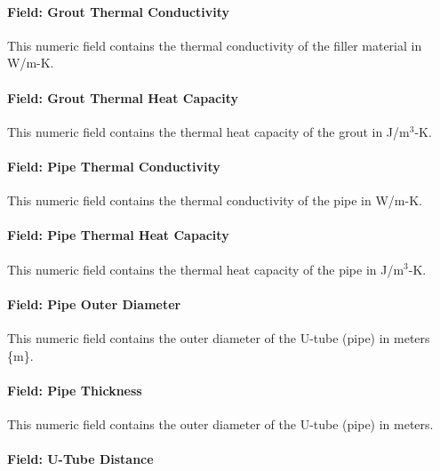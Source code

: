 \paragraph{Field: Grout Thermal Conductivity}\label{field-grout-thermal-conductivity}

This numeric field contains the thermal conductivity of the filler material in W/m-K.

\paragraph{Field: Grout Thermal Heat Capacity}

This numeric field contains the thermal heat capacity of the grout in J/m\(^{3}\)-K.

\paragraph{Field: Pipe Thermal Conductivity}\label{field-pipe-thermal-conductivity-000}

This numeric field contains the thermal conductivity of the pipe in W/m-K.

\paragraph{Field: Pipe Thermal Heat Capacity}

This numeric field contains the thermal heat capacity of the pipe in J/m\(^{3}\)-K.

\paragraph{Field: Pipe Outer Diameter}\label{field-pipe-out-diameter}

This numeric field contains the outer diameter of the U-tube (pipe) in meters \{m\}.

\paragraph{Field: Pipe Thickness}\label{field-pipe-thickness-000}

This numeric field contains the outer diameter of the U-tube (pipe) in meters.

\paragraph{Field: U-Tube Distance}\label{field-u-tube-distance}

